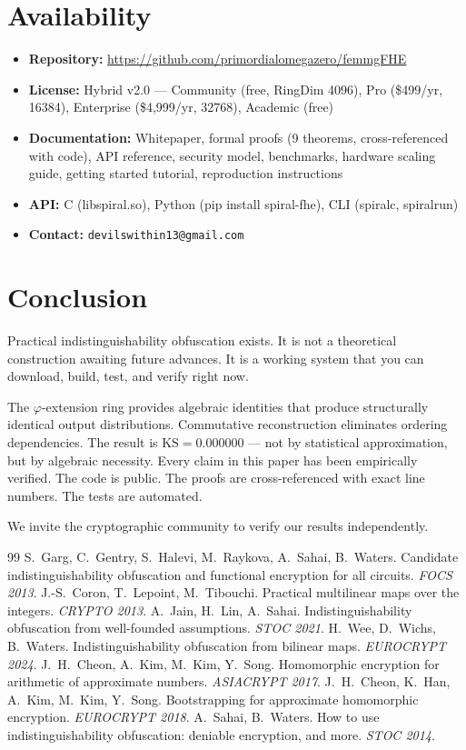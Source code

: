 \documentclass[11pt,a4paper]{article}
\begin{document}
\section{Availability}

\begin{itemize}
\item \textbf{Repository:} \url{https://github.com/primordialomegazero/femmgFHE}
\item \textbf{License:} Hybrid v2.0 --- Community (free, RingDim 4096), Pro (\$499/yr, 16384), Enterprise (\$4,999/yr, 32768), Academic (free)
\item \textbf{Documentation:} Whitepaper, formal proofs (9 theorems, cross-referenced with code), API reference, security model, benchmarks, hardware scaling guide, getting started tutorial, reproduction instructions
\item \textbf{API:} C (libspiral.so), Python (pip install spiral-fhe), CLI (spiralc, spiralrun)
\item \textbf{Contact:} \texttt{devilswithin13@gmail.com}
\end{itemize}

\section{Conclusion}

Practical indistinguishability obfuscation exists. It is not a theoretical construction awaiting future advances. It is a working system that you can download, build, test, and verify right now.

The $\varphi$-extension ring provides algebraic identities that produce structurally identical output distributions. Commutative reconstruction eliminates ordering dependencies. The result is $\text{KS} = 0.000000$ --- not by statistical approximation, but by algebraic necessity. Every claim in this paper has been empirically verified. The code is public. The proofs are cross-referenced with exact line numbers. The tests are automated.

We invite the cryptographic community to verify our results independently.

\begin{thebibliography}{99}
 S.~Garg, C.~Gentry, S.~Halevi, M.~Raykova, A.~Sahai, B.~Waters. Candidate indistinguishability obfuscation and functional encryption for all circuits. \textit{FOCS 2013}.
 J.-S.~Coron, T.~Lepoint, M.~Tibouchi. Practical multilinear maps over the integers. \textit{CRYPTO 2013}.
 A.~Jain, H.~Lin, A.~Sahai. Indistinguishability obfuscation from well-founded assumptions. \textit{STOC 2021}.
 H.~Wee, D.~Wichs, B.~Waters. Indistinguishability obfuscation from bilinear maps. \textit{EUROCRYPT 2024}.
 J.~H.~Cheon, A.~Kim, M.~Kim, Y.~Song. Homomorphic encryption for arithmetic of approximate numbers. \textit{ASIACRYPT 2017}.
 J.~H.~Cheon, K.~Han, A.~Kim, M.~Kim, Y.~Song. Bootstrapping for approximate homomorphic encryption. \textit{EUROCRYPT 2018}.
 A.~Sahai, B.~Waters. How to use indistinguishability obfuscation: deniable encryption, and more. \textit{STOC 2014}.
\end{thebibliography}
\end{document}
